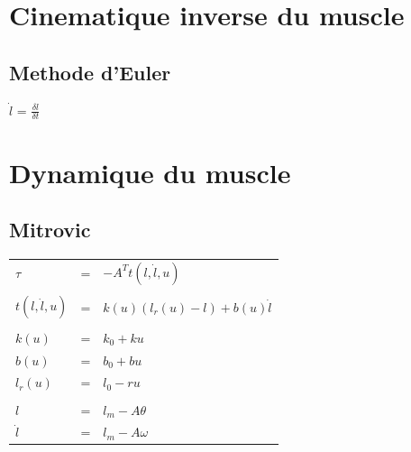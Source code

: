\documentclass[pdftex,a4paper,11pt]{article}
\begin{document}
\section{Cinematique inverse du muscle}

\subsection{Methode d'Euler}

$\dot{l}$ = $\frac{\delta l}{\delta t}$ \\
    

\section{Dynamique du muscle}

\subsection{Mitrovic}

\begin{tabular}{lcl}
    $\tau$ & = & $-A^T t(l, \dot{l}, u)$ \\
    & & \\
    $t(l, \dot{l}, u)$        & = & $k(u) (l_r(u) - l) + b(u) \dot{l}$ \\
    & & \\
    $k(u)$    & = & $k_0 + k u$ \\
    $b(u)$    & = & $b_0 + b u$ \\
    $l_r(u)$  & = & $l_0 - r u$ \\
    & & \\
    $l$       & = & $l_m - A \theta $ \\
    $\dot{l}$ & = & $l_m - A \omega $ \\
\end{tabular}
\end{document}
